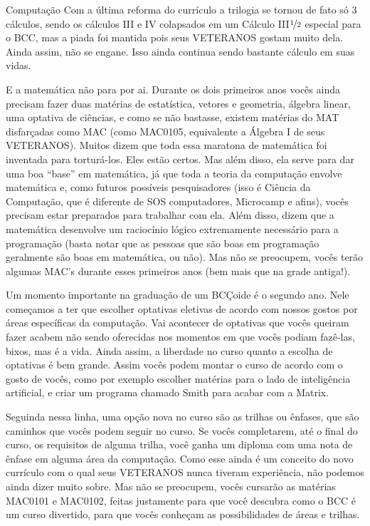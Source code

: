 \begin{subsecao}{Computação}
Com a última reforma do currículo a trilogia se tornou de fato só 3 cálculos,
sendo os cálculos III e IV colapsados em um Cálculo III$\nicefrac{1}{2}$
especial para o BCC, mas a piada foi mantida pois seus VETERANOS gostam muito
dela. Ainda assim, não se engane. Isso ainda continua sendo bastante cálculo em
suas vidas.

E a matemática não para por ai. Durante os dois primeiros anos vocês ainda
precisam fazer duas matérias de estatística, vetores e geometria, álgebra
linear, uma optativa de ciências, e como se não bastasse, existem matérias do
MAT disfarçadas como MAC (como MAC0105, equivalente a Álgebra I de seus
VETERANOS). Muitos dizem que toda essa maratona de matemática foi inventada para
torturá-los. Eles estão certos. Mas além disso, ela serve para dar uma boa
``base'' em matemática, já que toda a teoria da computação envolve matemática
e, como futuros possíveis pesquisadores (isso é Ciência da Computação, que é
diferente de SOS computadores, Microcamp e afins), vocês precisam estar
preparados para trabalhar com ela. Além disso, dizem que a matemática
desenvolve um raciocínio lógico extremamente necessário para a programação
(basta notar que as pessoas que são boas em programação geralmente são boas em
matemática, ou não). Mas não se preocupem, vocês terão algumas MAC's durante
esses primeiros anos (bem mais que na grade antiga!).

Um momento importante na graduação de um BCÇoide é o segundo ano. Nele começamos
a ter que escolher optativas eletivas de acordo com nossos gostos por áreas
específicas da computação. Vai acontecer de optativas que vocês queiram fazer
acabem não sendo oferecidas nos momentos em que vocês podiam fazê-las, bixos,
mas é a vida. Ainda assim, a liberdade no curso quanto a escolha de optativas é
bem grande. Assim vocês podem montar o curso de acordo com o gosto de vocês,
como por exemplo escolher matérias para o lado de inteligência artificial, e
criar um programa chamado Smith para acabar com a Matrix.

Seguinda nessa linha, uma opção nova no curso são as trilhas ou ênfases, que
são caminhos que vocês podem seguir no curso. Se vocês completarem, até o final
do curso, os requisitos de alguma trilha, você ganha um diploma com uma nota de
ênfase em alguma área da computação. Como esse ainda é um conceito do novo
currículo com o qual seus VETERANOS nunca tiveram experiência, não podemos
ainda dizer muito sobre. Mas não se preocupem, vocês cursarão as matérias
MAC0101 e MAC0102, feitas justamente para que você descubra como o BCC é um
curso divertido, para que vocês conheçam as possibilidades de áreas e trilhas.


\end{subsecao}
